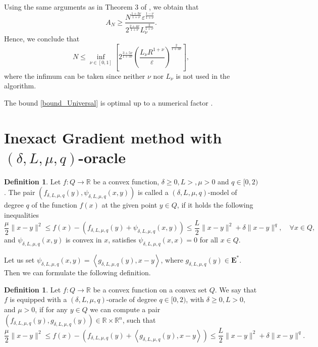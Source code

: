 \documentclass[11pt]{amsart}
\theoremstyle{definition}
\newtheorem{definition}[theorem]{Definition}
\numberwithin{equation}{section}
\begin{document}
Using the same arguments as in Theorem 3 of \cite{Nesterov2015Universal}, we obtain that
$$
    A_N \geq \frac{N^{\frac{1+3 \nu}{1+\nu}} \varepsilon^{\frac{1-\nu}{1+\nu}}}{2^{\frac{2+4 \nu}{1+\nu}} L_{\nu}^{\frac{2}{1+\nu}}}.
$$
Hence, we conclude that
\begin{equation}\label{bound_Universal}
    N \leq \inf_{\nu \in[0,1]}\left[2^{\frac{3+5 \nu}{1+3 \nu}}\left(\frac{L_{\nu} R^{1+\nu}}{\varepsilon}\right)^{\frac{2}{1+3 \nu}}\right], 
\end{equation}
where the infimum can be taken since neither $\nu$ nor $L_{\nu}$ is not used in the algorithm.

The bound \eqref{bound_Universal} is optimal up to a numerical factor \cite{Guzman2015lower}. 


\section{Inexact Gradient method with $(\delta, L, \mu, q)$-oracle}\label{sec:higher_deg_oracle}

\begin{definition}\label{def:inex_model_stronglyconvex}
Let $f: Q \longrightarrow \mathbb{R}$ be a convex function, $\delta \geq 0, L>, \mu > 0$ and $q \in [0,2)$. The pair $(f_{\delta, L, \mu, q} (y), \psi_{\delta, L , \mu,   q} (x, y))$ is called a $(\delta, L, \mu, q)$-model of degree $q$ of the function $f(x)$ at the given point $y \in Q$, if it holds the following inequalities
\begin{equation}\label{ineq_inex_model_stronglyconvex}
    \frac{\mu}{2} \|x - y\|^2 \leq f(x) - \left( f_{\delta, L, \mu, q} (y) + \psi_{\delta, L, \mu, q} (x, y)\right) \leq \frac{L}{2} \|x - y\|^2 + \delta \|x - y\|^q, \quad \forall x \in Q,
\end{equation}
and $\psi_{\delta, L, \mu,  q} (x, y)$  is convex in $x$, satisfies $\psi_{\delta, L , \mu,  q}(x,x) = 0$  for all $x \in Q$. 
\end{definition}

Let us set  $\psi_{\delta, L, \mu,  q} (x, y) = \left\langle g_{\delta, L, \mu,  q}(y) , x - y\right\rangle$, where $g_{\delta, L, \mu,  q}(y) \in \textbf{E}^*$. Then we can formulate the following definition.

\begin{definition}\label{def_q_oracle_strongly}
Let $f: Q \longrightarrow \mathbb{R}$ be a convex function on a convex set $Q$. We say that $f$ is equipped with a $(\delta, L, \mu, q)$-oracle of degree $q \in [0, 2)$, with $\delta \geq 0, L>0,$ and $ \mu > 0$,  if for any $y \in Q$ we can compute a pair $\left(f_{\delta, L, \mu, q}(y), g_{\delta, L, \mu, q}(y)\right) \in \mathbb{R} \times \mathbb{R}^n$, such that 
\begin{equation}\label{def_q_oracle_srongly}
    \frac{\mu}{2} \|x - y\|^2 \leq f(x) - \left(f_{\delta, L, \mu, q}(y) + \left \langle g_{\delta, L, \mu, q} (y), x - y  \right \rangle  \right) \leq \frac{L}{2} \|x - y\|^2 + \delta \|x - y\|^q.
\end{equation}
\end{definition}
\end{document}
